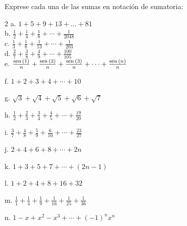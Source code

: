 \begin{ejer}{Exprese cada una de las sumas en notación de sumatoria:}

\begin{multicols}{2}
a. $1+5+9+13+\ldots +81$\\


b. $\frac{1}{2}+\frac{1}{4}+\frac{1}{8}+\cdots +\frac{1}{2048}$\\


c. $\frac{1}{3}+\frac{1}{8}+\frac{1}{13}+\cdots +\frac{1}{203}$\\


d. $\frac{2}{7}+\frac{3}{8}+\frac{4}{9}+\cdots +\frac{100}{105}$\\


e. $\frac{\text{\rm sen}\,(1)}{n}+\frac{\text{\rm sen}\,(2)}{n}+\frac{\text{\rm sen}\,(3)}{n}+\cdots +\frac{\text{\rm sen}\,(n)}{n}$


f. $1+2+3+4+\cdots +10$


g. $\sqrt{3}+\sqrt{4}+\sqrt{5}+\sqrt{6}+\sqrt{7}$


h. $\frac{1}{2}+\frac{2}{3}+\frac{3}{4}+\frac{4}{5}+\cdots +\frac{19}{20}$


i. $\frac{3}{7}+\frac{4}{8}+\frac{5}{9}+\frac{6}{10}+\cdots +\frac{23}{27}$


j. $2+4+6+8+\cdots +2n$


k. $1+3+5+7+\cdots +(2n-1)$


l. $1+2+4+8+16+32$


m. $\frac{1}{1}+\frac{1}{4}+\frac{1}{9}+\frac{1}{16}+\frac{1}{25}+\frac{1}{36}$


n. $1-x+x^{2}-x^{3}+\cdots +(-1)^{n}x^{n}$
\end{multicols}
\end{ejer}




